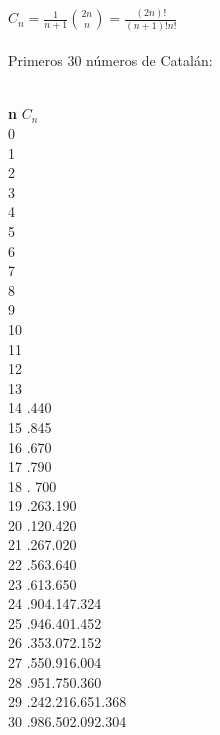 
{\LARGE $C_{n} = \frac{1}{n+1}\binom{2n}{n} = \frac{(2n)!}{(n+1)!n!}$}
\\ \\
Primeros 30 n\'umeros de Catal\'an:
\\ \\
\begin{tabbing}
\textbf{n}\hspace{3cm} \=  \textbf{$C_{n}$}\hspace{4cm}  \\ 
0  \\ 
1  \\ 
2  \\ 
3  \\ 
4  \\ 
5  \\ 
6  \\ 
7  \\ 
8 \\ 
9 \\ 
10 \\ 
11 \\
12 \\
13 \\ 
14 .440\\ 
15 .845\\ 
16 .670\\
17 .790\\
18 . 700\\
19 .263.190\\
20 .120.420\\ 
21 .267.020\\
22 .563.640\\ 
23 .613.650\\ 
24 .904.147.324\\
25 .946.401.452\\ 
26 .353.072.152\\ 
27 .550.916.004\\ 
28 .951.750.360\\ 
29 .242.216.651.368\\
30 .986.502.092.304\\ 
\end{tabbing}

